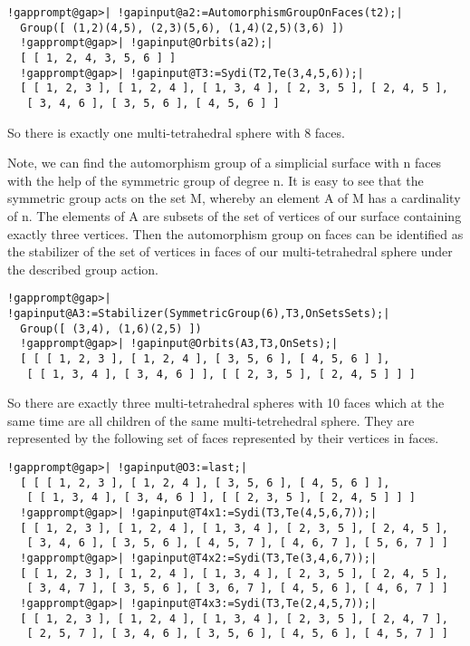 \documentclass[a4paper,11pt]{report}
\begin{document}
{{{ 
\begin{Verbatim}[commandchars=!@|,fontsize=\small,frame=single,label=Example]
  !gapprompt@gap>| !gapinput@a2:=AutomorphismGroupOnFaces(t2);|
  Group([ (1,2)(4,5), (2,3)(5,6), (1,4)(2,5)(3,6) ])
  !gapprompt@gap>| !gapinput@Orbits(a2);|
  [ [ 1, 2, 4, 3, 5, 6 ] ]
  !gapprompt@gap>| !gapinput@T3:=Sydi(T2,Te(3,4,5,6));|
  [ [ 1, 2, 3 ], [ 1, 2, 4 ], [ 1, 3, 4 ], [ 2, 3, 5 ], [ 2, 4, 5 ], 
   [ 3, 4, 6 ], [ 3, 5, 6 ], [ 4, 5, 6 ] ]
\end{Verbatim}
 

 So there is exactly one multi-tetrahedral sphere with 8 faces. 
\begin{center}

\end{center}
 Note, we can find the automorphism group of a simplicial surface with n faces
with the help of the symmetric group of degree n. It is easy to see that the
symmetric group acts on the set M, whereby an element A of M has a cardinality
of n. The elements of A are subsets of the set of vertices of our surface
containing exactly three vertices. Then the automorphism group on faces can be
identified as the stabilizer of the set of vertices in faces of our
multi-tetrahedral sphere under the described group action. 

 
\begin{Verbatim}[commandchars=!@|,fontsize=\small,frame=single,label=Example]
  !gapprompt@gap>| !gapinput@A3:=Stabilizer(SymmetricGroup(6),T3,OnSetsSets);|
  Group([ (3,4), (1,6)(2,5) ])
  !gapprompt@gap>| !gapinput@Orbits(A3,T3,OnSets);|
  [ [ [ 1, 2, 3 ], [ 1, 2, 4 ], [ 3, 5, 6 ], [ 4, 5, 6 ] ], 
   [ [ 1, 3, 4 ], [ 3, 4, 6 ] ], [ [ 2, 3, 5 ], [ 2, 4, 5 ] ] ]
\end{Verbatim}
 

 So there are exactly three multi-tetrahedral spheres with 10 faces which at
the same time are all children of the same multi-tetrehedral sphere. They are
represented by the following set of faces represented by their vertices in
faces. 

 
\begin{Verbatim}[commandchars=!@|,fontsize=\small,frame=single,label=Example]
  !gapprompt@gap>| !gapinput@O3:=last;|
  [ [ [ 1, 2, 3 ], [ 1, 2, 4 ], [ 3, 5, 6 ], [ 4, 5, 6 ] ], 
   [ [ 1, 3, 4 ], [ 3, 4, 6 ] ], [ [ 2, 3, 5 ], [ 2, 4, 5 ] ] ]
  !gapprompt@gap>| !gapinput@T4x1:=Sydi(T3,Te(4,5,6,7));|
  [ [ 1, 2, 3 ], [ 1, 2, 4 ], [ 1, 3, 4 ], [ 2, 3, 5 ], [ 2, 4, 5 ], 
   [ 3, 4, 6 ], [ 3, 5, 6 ], [ 4, 5, 7 ], [ 4, 6, 7 ], [ 5, 6, 7 ] ]
  !gapprompt@gap>| !gapinput@T4x2:=Sydi(T3,Te(3,4,6,7));|
  [ [ 1, 2, 3 ], [ 1, 2, 4 ], [ 1, 3, 4 ], [ 2, 3, 5 ], [ 2, 4, 5 ], 
   [ 3, 4, 7 ], [ 3, 5, 6 ], [ 3, 6, 7 ], [ 4, 5, 6 ], [ 4, 6, 7 ] ]
  !gapprompt@gap>| !gapinput@T4x3:=Sydi(T3,Te(2,4,5,7));|
  [ [ 1, 2, 3 ], [ 1, 2, 4 ], [ 1, 3, 4 ], [ 2, 3, 5 ], [ 2, 4, 7 ], 
   [ 2, 5, 7 ], [ 3, 4, 6 ], [ 3, 5, 6 ], [ 4, 5, 6 ], [ 4, 5, 7 ] ]
\end{Verbatim}
 

}}}
\end{document}
